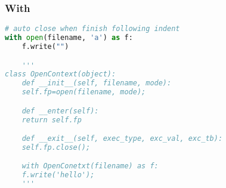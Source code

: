 \subsubsection{With}
\begin{lstlisting}[language=Python]
# auto close when finish following indent
with open(filename, 'a') as f:
    f.write("")

    '''
class OpenContext(object):
    def __init__(self, filename, mode):
    self.fp=open(filename, mode);

    def __enter(self):
    return self.fp

    def __exit__(self, exec_type, exc_val, exc_tb):
    self.fp.close();

    with OpenConetxt(filename) as f:
    f.write('hello');
    '''
\end{lstlisting}

%







